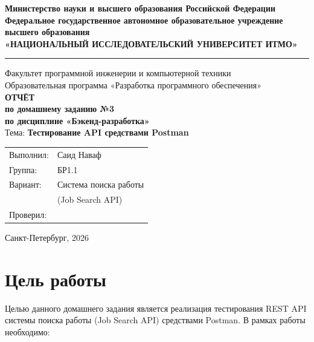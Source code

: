 ﻿\documentclass[a4paper,14pt]{extarticle}
\begin{document}
\begin{titlepage}
  \begin{center}
    \textbf{Министерство науки и высшего образования Российской Федерации}\\[0.3cm]
    \textbf{Федеральное государственное автономное образовательное учреждение\\
    высшего образования}\\[0.3cm]
    \textbf{«НАЦИОНАЛЬНЫЙ ИССЛЕДОВАТЕЛЬСКИЙ УНИВЕРСИТЕТ ИТМО»}\\[0.5cm]
    \hrule
    \vspace{0.3cm}
    Факультет программной инженерии и компьютерной техники\\[0.2cm]
    Образовательная программа «Разработка программного обеспечения»\\[2cm]

    \large\textbf{ОТЧЁТ}\\[0.3cm]
    \textbf{по домашнему заданию №3}\\[0.3cm]
    \textbf{по дисциплине «Бэкенд-разработка»}\\[0.5cm]
    \normalsize Тема: \textbf{Тестирование API средствами Postman}\\[3cm]

    \begin{flushright}
      \begin{tabular}{ll}
        Выполнил: & Саид Наваф\\
        Группа:   & БР1.1\\
        Вариант:  & Система поиска работы\\
                  & (Job Search API)\\[0.5cm]
        Проверил: & \\
      \end{tabular}
    \end{flushright}

    \vfill
    Санкт-Петербург, 2026
  \end{center}
\end{titlepage}

\tableofcontents
\newpage

\section{Цель работы}

Целью данного домашнего задания является реализация тестирования REST API системы поиска работы (Job Search API) средствами Postman. В рамках работы необходимо:
\end{document}
